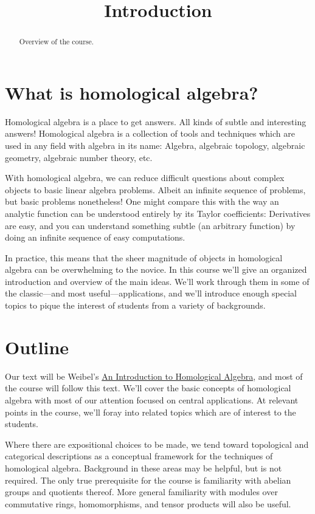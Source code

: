 \documentclass{ximera}
\title{Introduction}
\begin{document}
\begin{abstract}
Overview of the course.
\end{abstract}
\maketitle

\section{What is homological algebra?}

Homological algebra is a place to get answers. All kinds of subtle and
interesting answers! Homological algebra is a collection of tools and
techniques which are used in any field with algebra in its name:
Algebra, algebraic topology, algebraic geometry, algebraic number
theory, etc.

With homological algebra, we can reduce difficult questions about
complex objects to basic linear algebra problems. Albeit an infinite
sequence of problems, but basic problems nonetheless! One might
compare this with the way an analytic function can be understood
entirely by its Taylor coefficients: Derivatives are easy, and you can
understand something subtle (an arbitrary function) by doing an
infinite sequence of easy computations.

In practice, this means that the sheer magnitude of objects in
homological algebra can be overwhelming to the novice. In this course
we'll give an organized introduction and overview of the main
ideas. We'll work through them in some of the classic—and most
useful—applications, and we'll introduce enough special topics to
pique the interest of students from a variety of backgrounds.



\section{Outline}

Our text will be Weibel's
\href{http://www.amazon.com/gp/offer-listing/0521559871/ref=dp_olp_used?ie=UTF8&condition=used}{An
  Introduction to Homological Algebra}, and most of the course will
follow this text. We'll cover the basic concepts of homological
algebra with most of our attention focused on central applications. At
relevant points in the course, we'll foray into related topics which
are of interest to the students.

Where there are expositional choices to be made, we tend toward
topological and categorical descriptions as a conceptual framework for
the techniques of homological algebra. Background in these areas may
be helpful, but is not required. The only true prerequisite for the
course is familiarity with abelian groups and quotients thereof. More
general familiarity with modules over commutative rings,
homomorphisms, and tensor products will also be useful.
\end{document}
